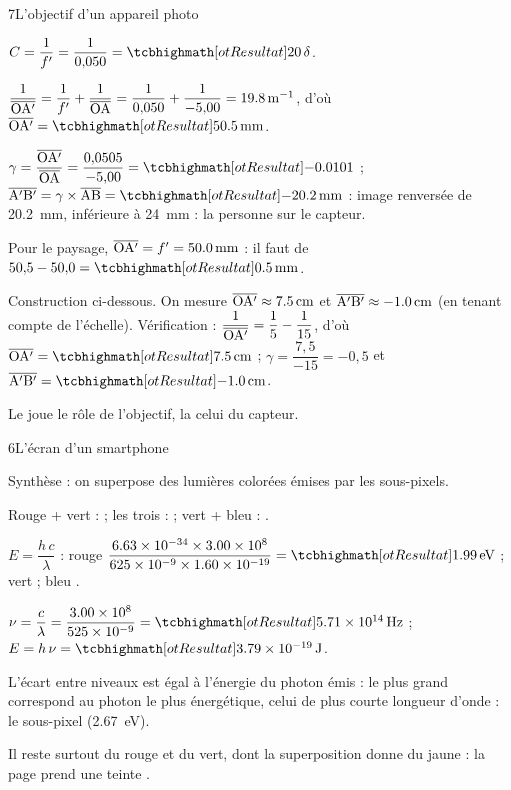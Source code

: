 \begin{corrigeBac}{7}{L'objectif d'un appareil photo}
\begin{questions}
\item $C=\dfrac{1}{f'}=\dfrac{1}{0{,}050}=\res{\num{20}\,\delta}$. 
\item $\dfrac{1}{\overline{\mathrm{OA'}}}=\dfrac{1}{f'}+\dfrac{1}{\overline{\mathrm{OA}}}=\dfrac{1}{0{,}050}+\dfrac{1}{-5{,}00}=\qty{19,8}{m^{-1}}$, d'où $\alg{OA'}=\res{\qty{50,5}{mm}}$. 
\item $\gamma=\dfrac{\alg{OA'}}{\alg{OA}}=\dfrac{0{,}0505}{-5{,}00}=\res{\num{-0,0101}}$ ; $\alg{A'B'}=\gamma\times\alg{AB}=\res{\qty{-20,2}{mm}}$ : image renversée de
\qty{20,2}{mm}, inférieure à \qty{24}{mm} : la personne  sur le capteur. 
\item Pour le paysage, $\overline{\mathrm{OA'}}=f'=\qty{50,0}{mm}$ : il faut  de $50{,}5-50{,}0=\res{\qty{0,5}{mm}}$. \pts{1 pt}
\item Construction ci-dessous. On mesure $\overline{\mathrm{OA'}}\approx\qty{7,5}{cm}$ et $\overline{\mathrm{A'B'}}\approx\qty{-1,0}{cm}$ (en tenant compte de l'échelle). Vérification :
$\dfrac{1}{\overline{\mathrm{OA'}}}=\dfrac15-\dfrac{1}{15}$, d'où $\alg{OA'}=\res{\qty{7,5}{cm}}$ ; $\gamma=\dfrac{7{,}5}{-15}=-0{,}5$ et $\alg{A'B'}=\res{\qty{-1,0}{cm}}$. 
\item Le  joue le rôle de l'objectif, la  celui du capteur. 
\end{questions}
\end{corrigeBac}

\begin{corrigeBac}{6}{L'écran d'un smartphone}
\begin{questions}
\item Synthèse  : on superpose des lumières colorées émises par les sous-pixels. 
\item Rouge + vert :  ; les trois :  ; vert + bleu : . \pts{1 pt}
\item $E=\dfrac{h\,c}{\lambda}$ : rouge $\dfrac{\num{6,63e-34}\times\num{3,00e8}}{\num{625e-9}\times\num{1,60e-19}}=\res{\qty{1,99}{eV}}$ ; vert  ; bleu . 
\item $\nu=\dfrac{c}{\lambda}=\dfrac{\num{3,00e8}}{\num{525e-9}}=\res{\qty{5,71e14}{Hz}}$ ; $E=h\,\nu=\res{\qty{3,79e-19}{J}}$. \pts{1 pt}
\item L'écart entre niveaux est égal à l'énergie du photon émis : le plus grand correspond au photon le plus énergétique, celui
de plus courte longueur d'onde : le sous-pixel  (\qty{2,67}{eV}). \pts{1 pt}
\item Il reste surtout du rouge et du vert, dont la superposition donne du jaune : la page prend une teinte . \pts{1 pt}
\end{questions}
\end{corrigeBac}
